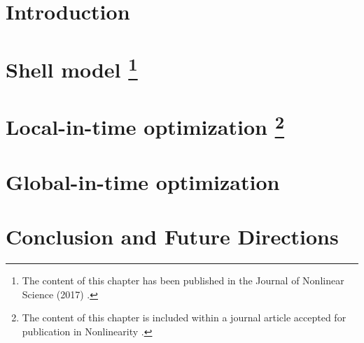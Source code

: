 \documentclass[reqno,hidelinks,12pt,oneside]{report} %
\theoremstyle{plain}
\theoremstyle{definition}
\theoremstyle{remark}
\numberwithin{theorem}{chapter}     %
\begin{document}
\startabstractpage

\label{Abstract}

\startthechapters 

 \chapter{Introduction}
 \label{chap:introduction}
 
\chapter[Shell model]{Shell model \footnote{The content of this chapter has been published in the Journal of Nonlinear Science (2017) \cite{Miles2017a}.}}
\label{chap:shellmodel}
 
 
 \chapter[Local-in-time optimization]{Local-in-time optimization \footnote{The content of this chapter is included  within a journal article accepted for publication in Nonlinearity \cite{Miles2018}.}}
 \label{chap:lit}
 
 
 \chapter{Global-in-time optimization}
 \label{chap:git}
 

 \chapter{Conclusion and Future Directions}
 \label{chap:conclusion}
 
 
\startappendices
 \label{app:shellmodel}
 
 
 \label{app:lit}
 
 
 \label{app:git}
 
 
 
% 
\startbibliography
 \begin{singlespace} %
 \end{singlespace}

%
\end{document}
